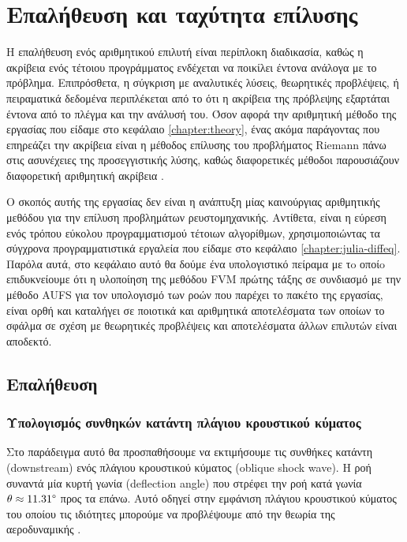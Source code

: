 \chapter{Επαλήθευση και ταχύτητα επίλυσης}
\label{chapter:results}

Η επαλήθευση ενός αριθμητικού επιλυτή είναι περίπλοκη διαδικασία, καθώς η ακρίβεια ενός τέτοιου προγράμματος ενδέχεται να ποικίλει έντονα ανάλογα με το πρόβλημα.
Επιπρόσθετα, η σύγκριση με αναλυτικές λύσεις, θεωρητικές προβλέψεις, ή πειραματικά δεδομένα περιπλέκεται από το ότι η ακρίβεια της πρόβλεψης εξαρτάται έντονα από το πλέγμα και την ανάλυσή του.
Όσον αφορά την αριθμητική μέθοδο της εργασίας που είδαμε στο κεφάλαιο \ref{chapter:theory}, ένας ακόμα παράγοντας που επηρεάζει την ακρίβεια είναι η μέθοδος επίλυσης του προβλήματος Riemann πάνω στις ασυνέχειες της προσεγγιστικής λύσης, καθώς διαφορετικές μέθοδοι παρουσιάζουν διαφορετική αριθμητική ακρίβεια \cite{Knight2006, Toro2012}.

Ο σκοπός αυτής της εργασίας δεν είναι η ανάπτυξη μίας καινούργιας αριθμητικής μεθόδου για την επίλυση προβλημάτων ρευστομηχανικής.
Αντίθετα, είναι η εύρεση ενός τρόπου εύκολου προγραμματισμού τέτοιων αλγορίθμων, χρησιμοποιώντας τα σύγχρονα προγραμματιστικά εργαλεία που είδαμε στο κεφάλαιο \ref{chapter:julia-diffeq}.
Παρόλα αυτά, στο κεφάλαιο αυτό θα δούμε ένα υπολογιστικό πείραμα με τo οποίo επιδυκνείουμε ότι η υλοποίηση της μεθόδου FVM πρώτης τάξης σε συνδιασμό με την μέθοδο AUFS για τον υπολογισμό των ροών που παρέχει το πακέτο της εργασίας, είναι ορθή και καταλήγει σε ποιοτικά και αριθμητικά αποτελέσματα των οποίων το σφάλμα σε σχέση με θεωρητικές προβλέψεις και αποτελέσματα άλλων επιλυτών είναι αποδεκτό.

\section{Επαλήθευση}

\subsection{Υπολογισμός συνθηκών κατάντη πλάγιου κρουστικού κύματος}

Στο παράδειγμα αυτό θα προσπαθήσουμε να εκτιμήσουμε τις συνθήκες κατάντη (downstream) ενός πλάγιου κρουστικού κύματος (oblique shock wave).
Η ροή συναντά μία κυρτή γωνία (deflection angle) που στρέφει την ροή κατά γωνία $\theta \approx 11.31 \degree$ προς τα επάνω.
Αυτό οδηγεί στην εμφάνιση πλάγιου κρουστικού κύματος του οποίου τις ιδιότητες μπορούμε να προβλέψουμε από την θεωρία της αεροδυναμικής \cite{Anderson2003}.

